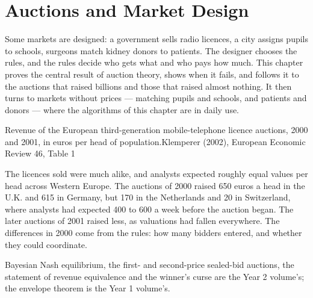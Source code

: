 \chapter{Auctions and Market Design}\label{ch:b3:auctions-and-market-design}

Some markets are designed: a government sells radio licences, a city assigns pupils
to schools, surgeons match kidney donors to patients. The designer chooses the
rules, and the rules decide who gets what and who pays how much. This chapter
proves the central result of auction theory, shows when it fails, and follows it to
the auctions that raised billions and those that raised almost nothing. It then
turns to markets without prices --- matching pupils and schools, and patients and
donors --- where the algorithms of this chapter are in daily use.

\begin{openingchart}{Revenue of the European third-generation mobile-telephone
licence auctions, 2000 and 2001, in euros per head of population.}{Klemperer (2002),
European Economic Review 46, Table 1}
\end{openingchart}

The licences sold were much alike, and analysts expected roughly equal values per
head across Western Europe. The auctions of 2000 raised 650 euros a head in the U.K. and
615 in Germany, but 170 in the Netherlands and 20 in Switzerland, where analysts had
expected 400 to 600 a week before the auction began. The later auctions of 2001 raised
less, as valuations had fallen everywhere. The differences in 2000 come from the
rules: how many bidders entered, and whether they could coordinate.

\begin{recall}
Bayesian Nash equilibrium, the first- and second-price sealed-bid auctions, the
statement of revenue equivalence and the winner's curse are the Year 2 volume's; the
envelope theorem is the Year 1 volume's.
\end{recall}


